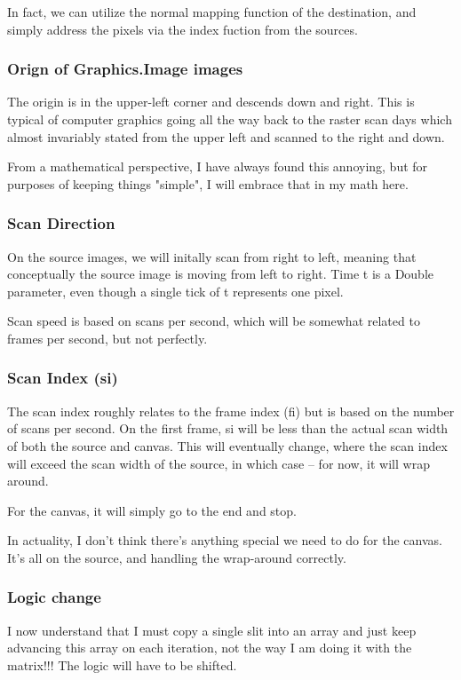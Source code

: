 \documentclass[letterpaper, 11pt]{article}
\begin{document}
In fact, we can utilize the normal mapping function of the destination, and 
simply address the pixels via the index fuction from the sources.

\subsubsection{Orign of Graphics.Image images}
\label{sec:orgc1a52c8}
The origin is in the upper-left corner and descends down and right.
This is typical of computer graphics going all the way back to the raster scan
days which almost invariably stated from the upper left and scanned to the
right and down.

From a mathematical perspective, I have always found this annoying, but for
purposes of keeping things "simple", I will embrace that in my math here.
\subsubsection{Scan Direction}
\label{sec:org38d5f95}
On the source images, we will initally scan from right to left, meaning that
conceptually the source image is moving from left to right. Time t is a Double
parameter, even though a single tick of t represents one pixel.

Scan speed is based on scans per second, which will be somewhat related to 
frames per second, but not perfectly.

\subsubsection{Scan Index (si)}
\label{sec:org065cc2f}
The scan index roughly relates to the frame index (fi) but is based
on the number of scans per second. On the first frame, si will be less than 
the actual scan width of both the source and canvas. This will eventually change,
where the scan index will exceed the scan width of the source, in which
case -- for now, it will wrap around.

For the canvas, it will simply go to the end and stop.

In actuality, I don't think there's anything special we need to do for the
canvas. It's all on the source, and handling the wrap-around correctly.
\subsubsection{Logic change}
\label{sec:org2fef6a3}
I now understand that I must copy a single slit into an array and just 
keep advancing this array on each iteration, not the way I am doing 
it with the matrix!!! The logic will have to be shifted.
\end{document}
